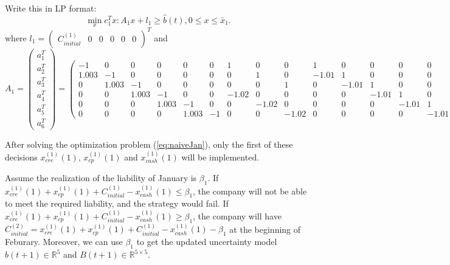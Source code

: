     Write this in LP format:
    \begin{equation}\label{eq:naiveJan}
        \min_x c_1^Tx: A_1x+l_1\geq\hat{b}(t), 0\leq x\leq \bar{x}_1.
    \end{equation}
    where $l_1 = \begin{pmatrix}C^{(1)}_{initial} & 0& 0& 0& 0& 0\end{pmatrix}^T$ and 
    \[
        A_1
        = 
        \begin{pmatrix}
            a_1^T \\
            a_2^T \\
            a_3^T \\
            a_4^T \\
            a_5^T \\
            a_6^T
        \end{pmatrix}
        =
        \begin{pmatrix}
            -1    &   0    &   0    &  0    &  0    &  0    &  1    &  0   &  0   &  1     &   0   &  0   &  0   &  0   \\
            1.003 &  -1    &   0    &  0    &  0    &  0    &  0    &  1   &  0   &  -1.01 &   1   &  0   &  0   &  0   \\
            0     & 1.003  &   -1   &  0    &  0    &  0    &  0    &  0   &  1   &  0     & -1.01 &  1   &  0   &  0   \\
            0     &  0     & 1.003  &   -1  &  0    &  0    & -1.02 &  0   &  0   &  0     &  0    & -1.01&  1   &  0   \\
            0     &  0     &  0     & 1.003 &  -1   &  0    &  0    &-1.02 &  0   &  0     &  0    &  0   &-1.01 &  1   \\
            0     &  0     &  0     &  0    & 1.003 &  -1   &  0    &  0   &-1.02 &  0     &  0    &  0   &  0   &-1.01
        \end{pmatrix}.
    \]

    After solving the optimization problem (\ref{eq:naiveJan}), only the first of these decisions $x^{(1)}_{cre}(1)$, $x^{(1)}_{cp}(1)$ and $x^{(1)}_{cash}(1)$ will be implemented. 

    Assume the realization of the liability of January is $\beta_1$. If $x^{(1)}_{cre}(1)+x^{(1)}_{cp}(1)+C^{(1)}_{initial} - x^{(1)}_{cash}(1) \leq \beta_1$, the company will not be able to meet the required liability, and the strategy would fail. If $x^{(1)}_{cre}(1)+x^{(1)}_{cp}(1)+C^{(1)}_{initial} - x^{(1)}_{cash}(1) \geq \beta_1$, the company will have $C^{(2)}_{initial} =  x^{(1)}_{cre}(1)+x^{(1)}_{cp}(1)+C^{(1)}_{initial} - x^{(1)}_{cash}(1) - \beta_1$ at the beginning of Feburary. Moreover, we can use $\beta_1$ to get the updated uncertainty model $\hat{b}(t+1)\in\mathbb{R}^5$ and $B(t+1)\in\mathbb{R}^{5\times5}$.

